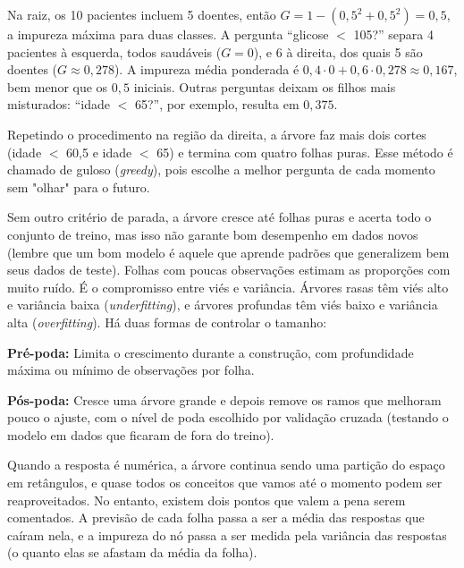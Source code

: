 {\subtitle{Um exemplo numérico}

\hspace*{1.5em}
Na raiz, os 10 pacientes incluem 5 doentes, então $G = 1 - (0{,}5^2 + 0{,}5^2) = 0{,}5$,
a impureza máxima para duas classes.
A pergunta ``glicose $<$ 105?'' separa 4 pacientes à esquerda, todos saudáveis ($G = 0$),
e 6 à direita, dos quais 5 são doentes ($G \approx 0{,}278$).
A impureza média ponderada é $0{,}4 \cdot 0 + 0{,}6 \cdot 0{,}278 \approx 0{,}167$,
bem menor que os $0{,}5$ iniciais.
Outras perguntas deixam os filhos mais misturados: ``idade $<$ 65?'', por exemplo, resulta em $0{,}375$.

\hspace*{1.5em}
Repetindo o procedimento na região da direita,
a árvore faz mais dois cortes (idade $<$ 60,5 e idade $<$ 65)
e termina com quatro folhas puras.
Esse método é chamado de guloso (\textit{greedy}),
pois escolhe a melhor pergunta de cada momento sem "olhar" para o futuro.

\subtitle{Quando a árvore decora os dados}

\hspace*{1.5em}
Sem outro critério de parada, a árvore cresce até folhas puras e acerta todo o conjunto de treino,
mas isso não garante bom desempenho em dados novos (lembre que um bom modelo é aquele que aprende padrões que generalizem bem seus dados de teste).
Folhas com poucas observações estimam as proporções com muito ruído.
É o compromisso entre viés e variância.
Árvores rasas têm viés alto e variância baixa (\textit{underfitting}),
e árvores profundas têm viés baixo e variância alta (\textit{overfitting}).
Há duas formas de controlar o tamanho:

\begin{hypeitemize}
    \item \textbf{Pré-poda:} Limita o crescimento durante a construção, com profundidade máxima ou mínimo de observações por folha.
    \item \textbf{Pós-poda:} Cresce uma árvore grande e depois remove os ramos que melhoram pouco o ajuste, com o nível de poda escolhido por validação cruzada (testando o modelo em dados que ficaram de fora do treino).
\end{hypeitemize}

\subtitle{E na regressão?}

\hspace*{1.5em}
Quando a resposta é numérica, a árvore continua sendo uma partição do espaço em retângulos,
e quase todos os conceitos que vamos até o momento podem ser reaproveitados.
No entanto, existem dois pontos que valem a pena serem comentados.
A previsão de cada folha passa a ser a média das respostas que caíram nela,
e a impureza do nó passa a ser medida pela variância das respostas
(o quanto elas se afastam da média da folha).

}
